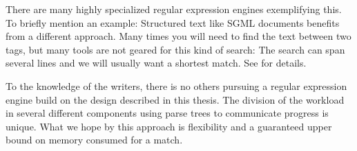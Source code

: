 There are many highly specialized regular expression engines
exemplifying this. To briefly mention an example: Structured text like
SGML documents benefits from a different approach. Many times you will
need to find the text between two tags, but many tools are not geared
for this kind of search: The search can span several lines and we will
usually want a shortest match. See \cite{pedersen2010} for details.

To the knowledge of the writers, there is no others pursuing a regular
expression engine build on the design described in this thesis. The
division of the workload in several different components using parse
trees to communicate progress is unique. What we hope by this approach
is flexibility and a guaranteed upper bound on memory consumed for a
match.


